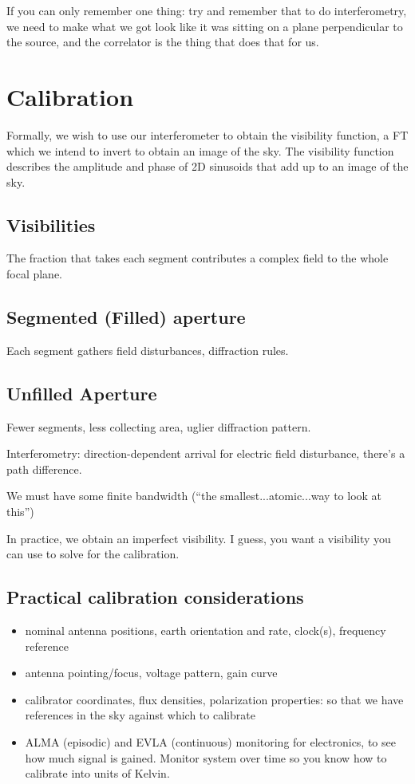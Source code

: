 \documentclass[a4paper]{article}
\begin{document}
If you can only remember one thing: try and remember that to do interferometry, we need to make what we got look like it was sitting on a plane perpendicular to the source, and the correlator is the thing that does that for us. 

\section{Calibration}

Formally, we wish to use our interferometer to obtain the visibility function, a FT which we intend to invert to obtain an image of the sky. The visibility function describes the amplitude and phase of 2D sinusoids that add up to an image of the sky. 

\subsection{Visibilities}

The fraction that takes each segment contributes a complex field to the whole focal plane. 

\subsection{Segmented (Filled) aperture}

Each segment gathers field disturbances, diffraction rules.

\subsection{Unfilled Aperture}

Fewer segments, less collecting area, uglier diffraction pattern. 

Interferometry: direction-dependent arrival for electric field disturbance, there's a path difference. 

We must have some finite bandwidth (``the smallest...atomic...way to look at this'')

In practice, we obtain an imperfect visibility. I guess, you want a visibility you can use to solve for the calibration.

\subsection{Practical calibration considerations}

\begin{itemize}

\item nominal antenna positions, earth orientation and rate, clock(s), frequency reference
\item antenna pointing/focus, voltage pattern, gain curve
\item calibrator coordinates, flux densities, polarization properties: so that we have references in the sky against which to calibrate
\item ALMA (episodic) and EVLA (continuous) monitoring for electronics, to see how much signal is gained. Monitor system over time so you know how to calibrate into units of Kelvin.

\end{itemize}
\end{document}
